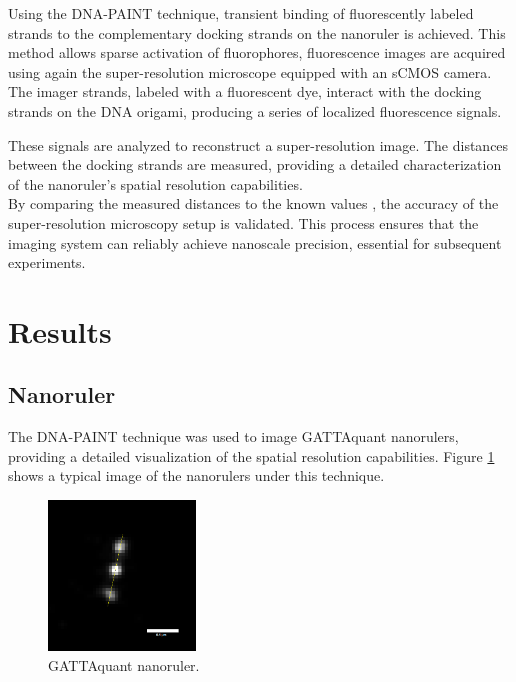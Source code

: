 \documentclass[a4paper,english,12pt,bibliography=totoc]{scrreprt}
\begin{document}
Using the DNA-PAINT technique, transient binding of fluorescently labeled strands to the complementary docking strands on the nanoruler is achieved. This method allows sparse activation of fluorophores, fluorescence images are acquired using again the super-resolution microscope equipped with an sCMOS camera. The imager strands, labeled with a fluorescent dye, interact with the docking strands on the DNA origami, producing a series of localized fluorescence signals.

These signals are analyzed to reconstruct a super-resolution image. The distances between the docking strands are measured, providing a detailed characterization of the nanoruler's spatial resolution capabilities.\\

By comparing the measured distances to the known values , the accuracy of the super-resolution microscopy setup is validated. This process ensures that the imaging system can reliably achieve nanoscale precision, essential for subsequent experiments.

\section{Results}

\subsection{Nanoruler}
The DNA-PAINT technique was used to image GATTAquant nanorulers, providing a detailed visualization of the spatial resolution capabilities. Figure \ref{fig:gattarulerl} shows a typical image of the nanorulers under this technique.

\begin{figure}[H]
    \centering
    \includegraphics[width=0.35\textwidth]{Images/PAINT/triple dots.png}
    \caption{GATTAquant nanoruler.}
    \label{fig:gattarulerl}
\end{figure}
\end{document}
